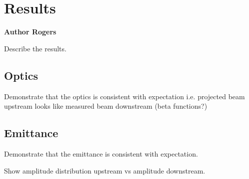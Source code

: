 \section{Results}

\textbf{Author Rogers}

Describe the results.

\subsection{Optics}

Demonstrate that the optics is consistent with expectation i.e. projected beam
upstream looks like measured beam downstream (beta functions?)

\subsection{Emittance}

Demonstrate that the emittance is consistent with expectation.

Show amplitude distribution upstream vs amplitude downstream.


